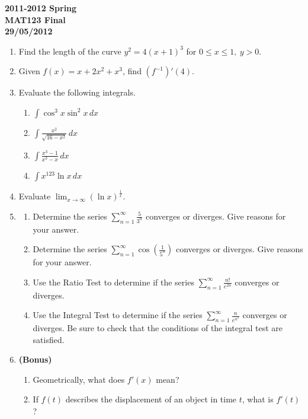 \documentclass[a4paper, 12pt]{article}
\begin{document}
\pagestyle{empty}

\begin{center}
\textbf{2011-2012 Spring\\MAT123 Final\\29/05/2012}
\end{center}

\begin{enumerate}[leftmargin=*,label=\textbf{\arabic*.}]
\item Find the length of the curve $y^2=4(x+1)^3$ for $0\leq x\leq1,\: y>0$.

\item Given $f(x)=x+2x^2+x^3$, find $\left(f^{-1}\right)'(4)$.

\item Evaluate the following integrals.
\begin{enumerate}[leftmargin=*,label=\textbf{\alph*.}]
\item $\displaystyle\int\cos^3x\sin^2x\,dx$
\item $\displaystyle\int\frac{x^2}{\sqrt{16-x^2}}\,dx$
\item $\displaystyle\int\frac{x^3-1}{x^3-x}\,dx$
\item $\displaystyle\int x^{123}\ln x\,dx$
\end{enumerate}

\item Evaluate $\displaystyle\lim_{x\to\infty}(\ln x)^{\textstyle\frac1x}$.

\item
\begin{enumerate}[leftmargin=*,label=\textbf{\alph*.}]
\item Determine the series  $\displaystyle\sum_{n=1}^\infty{\frac5{3^n}}$ converges or diverges. Give reasons for your answer.

\item Determine the series $\displaystyle\sum_{n=1}^\infty\cos\left(\frac1{5^n}\right)$ converges or diverges. Give reasons for your answer.

\item Use the Ratio Test to determine if the series $\displaystyle\sum_{n=1}^\infty\frac{n!}{ e^{2n}}$ converges or diverges.

\item Use the Integral Test to determine if the series $\displaystyle\sum_{n=1}^\infty\frac n{ e^{n^2}}$ converges or diverges. Be sure to check that the conditions of the integral test are satisfied.
\end{enumerate}

\item \textbf{(Bonus)}
\begin{enumerate}[leftmargin=*,label=\textbf{\alph*.}]
\item Geometrically, what does $f'(x)$ mean?
\item If $f(t)$ describes the displacement of an object in time $t$, what is $f'(t)$?
\end{enumerate}
\end{enumerate}
\end{document}
